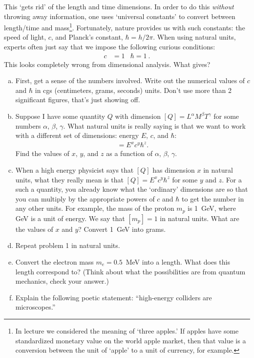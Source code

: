 \documentclass[12pt]{article}
\numberwithin{equation}{section}    %
\begin{document}
This `gets rid' of the length and time dimensions. In order to do this \emph{without} throwing away information, one uses `universal constants' to convert between length/time and mass\footnote{In lecture we considered the meaning of `three apples.' If apples have some standardized monetary value on the world apple market, then that value is a conversion between the unit of `apple' to a unit of currency, for example.}. Fortunately, nature provides us with such constants: the speed of light, $c$, and Planck's constant, $\hbar = h/2\pi$. When using natural units, experts often just say that we impose the following curious conditions:
\begin{align}
	c &= 1 
	&
	\hbar = 1 \ .
\end{align}
This looks completely wrong from dimensional analysis. What gives?

\begin{enumerate}[(a)]
	\item First, get a sense of the numbers involved. Write out the numerical values of $c$ and $\hbar$ in cgs (centimeters, grams, seconds) units. Don't use more than 2 significant figures, that's just showing off. 
	\item Suppose I have some quantity $Q$ with dimension $[Q] = L^\alpha M^\beta T^\gamma$ for some numbers $\alpha$, $\beta$, $\gamma$. What natural units is really saying is that we want to work with a different set of dimensions: energy $E$, $c$, and $\hbar$:
		\begin{align*}
			[Q] = E^x c^y \hbar^z .
		\end{align*}
		Find the values of $x$, $y$, and $z$ as a function of $\alpha$, $\beta$, $\gamma$.
	\item When a high energy physicist says that $[Q]$ has dimension $x$ in natural units, what they really mean is that $[Q] = E^x c^y \hbar^z$ for some $y$ and $z$. For a such a quantity, you already know what the `ordinary' dimensions are so that you can multiply by the appropriate powers of $c$ and $\hbar$ to get the number in any other units. For example, the mass of the proton $m_p$ is 1~GeV, where GeV is a unit of energy. We say that $[m_p] = 1$ in natural units. What are the values of $x$ and $y$? Convert 1~GeV into grams.
	\item Repeat problem 1 in natural units.%
	\item Convert the electron mass $m_e = 0.5$~MeV into a length. What does this length correspond to? (Think about what the possibilities are from quantum mechanics, check your answer.)
	\item Explain the following poetic statement: ``high-energy colliders are microscopes.''
\end{enumerate}
\end{document}
